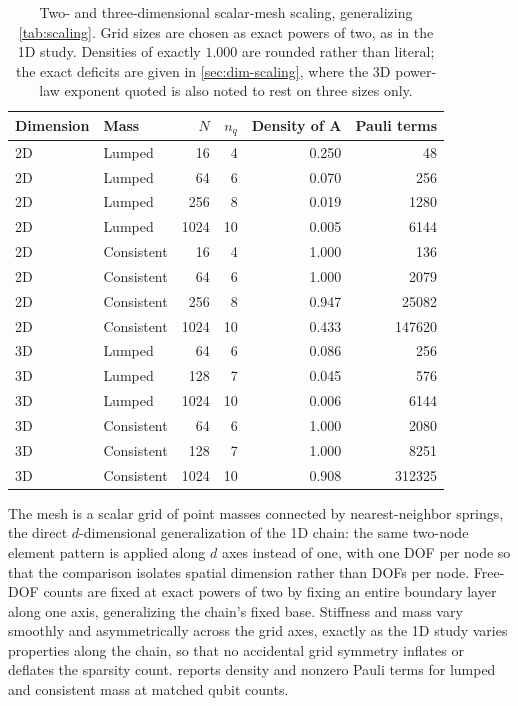 \documentclass{ieeeaccess}
\newcommand{\A}{\mathbf{A}}
\begin{document}
\begin{table}[t]
\centering
\caption{Two- and three-dimensional scalar-mesh scaling, generalizing \cref{tab:scaling}. Grid sizes are chosen as exact powers of two, as in the 1D study. Densities of exactly $1.000$ are rounded rather than literal; the exact deficits are given in \cref{sec:dim-scaling}, where the 3D power-law exponent quoted is also noted to rest on three sizes only.}
\label{tab:dimscaling}
\begin{tabular}{llrrrr}
\toprule
Dimension & Mass & $N$ & $n_q$ & Density of $\A$ & Pauli terms\\
\midrule
2D & Lumped & 16 & 4 & 0.250 & 48\\
2D & Lumped & 64 & 6 & 0.070 & 256\\
2D & Lumped & 256 & 8 & 0.019 & 1280\\
2D & Lumped & 1024 & 10 & 0.005 & 6144\\
2D & Consistent & 16 & 4 & 1.000 & 136\\
2D & Consistent & 64 & 6 & 1.000 & 2079\\
2D & Consistent & 256 & 8 & 0.947 & 25082\\
2D & Consistent & 1024 & 10 & 0.433 & 147620\\
3D & Lumped & 64 & 6 & 0.086 & 256\\
3D & Lumped & 128 & 7 & 0.045 & 576\\
3D & Lumped & 1024 & 10 & 0.006 & 6144\\
3D & Consistent & 64 & 6 & 1.000 & 2080\\
3D & Consistent & 128 & 7 & 1.000 & 8251\\
3D & Consistent & 1024 & 10 & 0.908 & 312325\\
\bottomrule
\end{tabular}
\end{table}

The mesh is a scalar grid of point masses connected by nearest-neighbor springs, the direct $d$-dimensional generalization of the 1D chain: the same two-node element pattern is applied along $d$ axes instead of one, with one DOF per node so that the comparison isolates spatial dimension rather than DOFs per node. Free-DOF counts are fixed at exact powers of two by fixing an entire boundary layer along one axis, generalizing the chain's fixed base. Stiffness and mass vary smoothly and asymmetrically across the grid axes, exactly as the 1D study varies properties along the chain, so that no accidental grid symmetry inflates or deflates the sparsity count.  reports density and nonzero Pauli terms for lumped and consistent mass at matched qubit counts.
\end{document}
